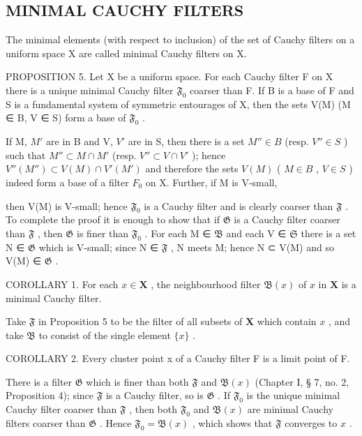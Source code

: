 \subsection{MINIMAL CAUCHY FILTERS}

The minimal elements (with respect to inclusion) of the set of Cauchy filters on a uniform space X are called minimal Cauchy filters on X.

PROPOSITION 5. Let X be a uniform space. For each Cauchy filter F on X there is a unique minimal Cauchy filter \(\mathfrak{F}_0\) coarser than F. If B is a base of F and S is a fundamental system of symmetric entourages of X, then the sets V(M) (M ∈ B, V ∈ S) form a base of \(\mathfrak{F}_0\) .

If M, \(M'\) are in B and V, \(V'\) are in S, then there is a set \(M'' \in B\) (resp. \(V'' \in S\) ) such that \(M'' \subset M \cap M'\) (resp. \(V'' \subset V \cap V'\) ); hence \(V''(M'') \subset V(M) \cap V'(M')\) and therefore the sets \(V(M)\) ( \(M \in B\) , \(V \in S\) ) indeed form a base of a filter \(F_0\) on X. Further, if M is V-small,

then V(M) is V-small; hence \(\mathfrak{F}_0\) is a Cauchy filter and is clearly coarser than \(\mathfrak{F}\) . To complete the proof it is enough to show that if \(\mathfrak{G}\) is a Cauchy filter coarser than \(\mathfrak{F}\) , then \(\mathfrak{G}\) is finer than \(\mathfrak{F}_0\) . For each M ∈ \(\mathfrak{B}\) and each V ∈ \(\mathfrak{S}\) there is a set N ∈ \(\mathfrak{G}\) which is V-small; since N ∈ \(\mathfrak{F}\) , N meets M; hence N ⊂ V(M) and so V(M) ∈ \(\mathfrak{G}\) .

COROLLARY 1. For each \(x \in \mathbf{X}\) , the neighbourhood filter \(\mathfrak{B}(x)\) of \(x\) in \(\mathbf{X}\) is a minimal Cauchy filter.

Take \(\mathfrak{F}\) in Proposition 5 to be the filter of all subsets of \(\mathbf{X}\) which contain \(x\) , and take \(\mathfrak{B}\) to consist of the single element \(\{x\}\) .

COROLLARY 2. Every cluster point x of a Cauchy filter F is a limit point of F.

There is a filter \(\mathfrak{G}\) which is finer than both \(\mathfrak{F}\) and \(\mathfrak{B}(x)\) (Chapter I, § 7, no. 2, Proposition 4); since \(\mathfrak{F}\) is a Cauchy filter, so is \(\mathfrak{G}\) . If \(\mathfrak{F}_0\) is the unique minimal Cauchy filter coarser than \(\mathfrak{F}\) , then both \(\mathfrak{F}_0\) and \(\mathfrak{B}(x)\) are minimal Cauchy filters coarser than \(\mathfrak{G}\) . Hence \(\mathfrak{F}_0 = \mathfrak{B}(x)\) , which shows that \(\mathfrak{F}\) converges to \(x\) .

